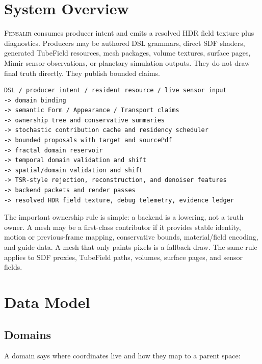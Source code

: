 \documentclass[11pt]{article}
\newcommand{\Fensalir}{\textsc{Fensalir}}
\begin{document}
\section{System Overview}

\Fensalir{} consumes producer intent and emits a resolved HDR field texture plus
diagnostics.  Producers may be authored DSL grammars, direct SDF shaders,
generated TubeField resources, mesh packages, volume textures, surface pages,
Mimir sensor observations, or planetary simulation outputs.  They do not draw
final truth directly.  They publish bounded claims.

\begin{center}
\begin{minipage}{0.92\linewidth}
\small
\begin{verbatim}
DSL / producer intent / resident resource / live sensor input
-> domain binding
-> semantic Form / Appearance / Transport claims
-> ownership tree and conservative summaries
-> stochastic contribution cache and residency scheduler
-> bounded proposals with target and sourcePdf
-> fractal domain reservoir
-> temporal domain validation and shift
-> spatial/domain validation and shift
-> TSR-style rejection, reconstruction, and denoiser features
-> backend packets and render passes
-> resolved HDR field texture, debug telemetry, evidence ledger
\end{verbatim}
\end{minipage}
\end{center}

The important ownership rule is simple: a backend is a lowering, not a truth
owner.  A mesh may be a first-class contributor if it provides stable identity,
motion or previous-frame mapping, conservative bounds, material/field encoding,
and guide data.  A mesh that only paints pixels is a fallback draw.  The same
rule applies to SDF proxies, TubeField paths, volumes, surface pages, and
sensor fields.

\section{Data Model}

\subsection{Domains}

A domain says where coordinates live and how they map to a parent space:
\end{document}
